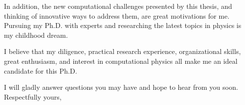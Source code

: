 \documentclass[11pt, a4paper]{awesome-cv}
\begin{document}
\begin{cvletter}
In addition, the new computational challenges presented by this thesis, and thinking of innovative ways to address them, are great motivations for me. Pursuing my Ph.D. with experts and researching the latest topics in physics is my childhood dream.

I believe that my diligence, practical research experience, organizational skills, great enthusiasm, and interest in computational physics all make me an ideal candidate for this Ph.D.

\vspace{1ex}
I will gladly answer questions you may have and hope to hear from you soon.\\
Respectfully yours,\\
	\end{cvletter}
	
	

	
\end{document}

